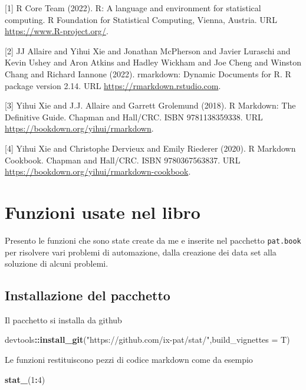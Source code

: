 \documentclass[
  11pt,
]{book}
\newenvironment{Shaded}{\begin{snugshade}}{\end{snugshade}}
\newcommand{\AttributeTok}[1]{\textcolor[rgb]{0.13,0.29,0.53}{#1}}
\newcommand{\DecValTok}[1]{\textcolor[rgb]{0.00,0.00,0.81}{#1}}
\newcommand{\FunctionTok}[1]{\textcolor[rgb]{0.13,0.29,0.53}{\textbf{#1}}}
\newcommand{\NormalTok}[1]{#1}
\newcommand{\SpecialCharTok}[1]{\textcolor[rgb]{0.81,0.36,0.00}{\textbf{#1}}}
\newcommand{\StringTok}[1]{\textcolor[rgb]{0.31,0.60,0.02}{#1}}
\theoremstyle{mytheoremstyle}
\theoremstyle{mydefstyle}
\begin{document}
{[}1{]} R Core Team (2022). R: A language and environment for statistical computing. R Foundation for Statistical Computing, Vienna, Austria. URL \url{https://www.R-project.org/}.

{[}2{]} JJ Allaire and Yihui Xie and Jonathan McPherson and Javier Luraschi and Kevin Ushey and Aron Atkins and Hadley Wickham and Joe Cheng and Winston Chang and Richard Iannone (2022). rmarkdown: Dynamic Documents for R. R package version 2.14. URL \url{https://rmarkdown.rstudio.com}.

{[}3{]} Yihui Xie and J.J. Allaire and Garrett Grolemund (2018). R Markdown: The Definitive Guide. Chapman and Hall/CRC. ISBN 9781138359338. URL \url{https://bookdown.org/yihui/rmarkdown}.

{[}4{]} Yihui Xie and Christophe Dervieux and Emily Riederer (2020). R Markdown Cookbook. Chapman and Hall/CRC. ISBN 9780367563837. URL \url{https://bookdown.org/yihui/rmarkdown-cookbook}.

\chapter{Funzioni usate nel libro}\label{funzioni-usate-nel-libro}

Presento le funzioni che sono state create da me e inserite nel pacchetto \texttt{pat.book} per risolvere vari problemi
di automazione, dalla creazione dei data set alla soluzione di alcuni problemi.

\section{Installazione del pacchetto}\label{installazione-del-pacchetto}

Il pacchetto si installa da github

\begin{Shaded}
\begin{Highlighting}[]
\NormalTok{devtools}\SpecialCharTok{::}\FunctionTok{install\_git}\NormalTok{(}\StringTok{"https://github.com/ix{-}pat/stat/"}\NormalTok{,}\AttributeTok{build\_vignettes =}\NormalTok{ T)}
\end{Highlighting}
\end{Shaded}

Le funzioni restituiscono pezzi di codice markdown come da esempio

\begin{Shaded}
\begin{Highlighting}[]
\FunctionTok{stat\_}\NormalTok{(}\DecValTok{1}\SpecialCharTok{:}\DecValTok{4}\NormalTok{)}
\end{Highlighting}
\end{Shaded}
\end{document}
